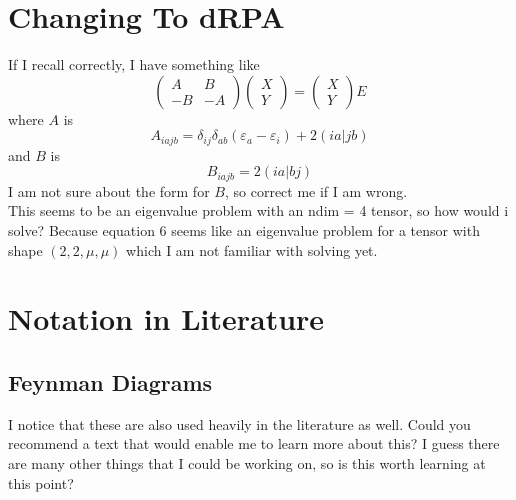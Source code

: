 \documentclass[12pt]{article}
\begin{document}
\section{Changing To dRPA}
If I recall correctly, I have something like
\begin{equation}
    \begin{pmatrix}
    A & B \\
    -B & -A
    \end{pmatrix}
    \begin{pmatrix}
    X \\
    Y
    \end{pmatrix}
    =
    \begin{pmatrix}
    X \\
    Y
    \end{pmatrix}
    E
\end{equation}
where $A$ is 
\begin{equation}
    A_{iajb}=\delta _{ij} \delta _{ab} \left(\varepsilon _{a}-\varepsilon _{i}\right) + 2(ia|jb)
\end{equation}
and $B$ is
\begin{equation}
    B_{iajb} = 2(ia|bj)
\end{equation}
I am not sure about the form for $B$, so correct me if I am wrong.\\
This seems to be an eigenvalue problem with an ndim = 4 tensor, so how would i solve? Because equation 6 seems like an eigenvalue problem for a tensor with shape $(2, 2, \mu, \mu)$ which I am not familiar with solving yet.



\section{Notation in Literature}
\subsection{Feynman Diagrams}
I notice that these are also used heavily in the literature as well. Could you recommend a text that would enable me to learn more about this? I guess there are many other things that I could be working on, so is this worth learning at this point?
\end{document}
